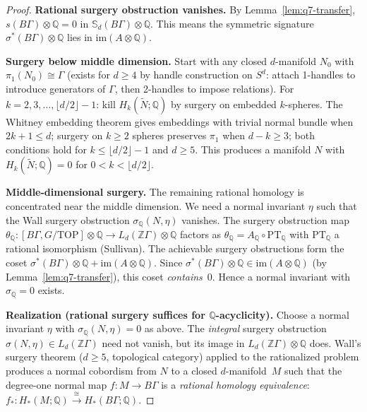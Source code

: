\begin{proof}
\textbf{Rational surgery obstruction vanishes.}
By Lemma~\ref{lem:q7-transfer},
$s(B\Gamma)\otimes\mathbb Q=0$ in $\mathbb S_d(B\Gamma)\otimes\mathbb Q$.
This means the symmetric signature $\sigma^*(B\Gamma)\otimes\mathbb Q$
lies in $\mathrm{im}(A\otimes\mathbb Q)$.

\medskip\noindent
\textbf{Surgery below middle dimension.}
Start with any closed $d$-manifold $N_0$ with $\pi_1(N_0)\cong\Gamma$
(exists for $d\ge 4$ by handle construction on $S^d$: attach 1-handles
to introduce generators of $\Gamma$, then 2-handles to impose relations).
For $k=2,3,\dots,\lfloor d/2\rfloor-1$: kill $H_k(\widetilde N;\mathbb Q)$
by surgery on embedded $k$-spheres.
The Whitney embedding theorem gives embeddings with trivial normal bundle when
$2k+1\le d$; surgery on $k\ge2$ spheres preserves $\pi_1$ when $d-k\ge3$;
both conditions hold for $k\le\lfloor d/2\rfloor-1$ and $d\ge5$.
This produces a manifold $N$ with $H_k(\widetilde N;\mathbb Q)=0$
for $0<k<\lfloor d/2\rfloor$.

\medskip\noindent
\textbf{Middle-dimensional surgery.}
The remaining rational homology is concentrated near the middle dimension.
We need a normal invariant $\eta$ such that the Wall surgery obstruction
$\sigma_{\mathbb Q}(N,\eta)$ vanishes.
The surgery obstruction map
$\theta_{\mathbb Q}\colon[B\Gamma,G/\mathrm{TOP}]\otimes\mathbb Q
 \to L_d(\mathbb Z\Gamma)\otimes\mathbb Q$
factors as $\theta_{\mathbb Q}=A_{\mathbb Q}\circ\mathrm{PT}_{\mathbb Q}$
with $\mathrm{PT}_{\mathbb Q}$ a rational isomorphism (Sullivan).
The achievable surgery obstructions form the coset
$\sigma^*(B\Gamma)\otimes\mathbb Q + \mathrm{im}(A\otimes\mathbb Q)$.
Since $\sigma^*(B\Gamma)\otimes\mathbb Q\in\mathrm{im}(A\otimes\mathbb Q)$
(by Lemma~\ref{lem:q7-transfer}), this coset \emph{contains}~$0$.
Hence a normal invariant with $\sigma_{\mathbb Q}=0$ exists.

\medskip\noindent
\textbf{Realization (rational surgery suffices for $\mathbb Q$-acyclicity).}
Choose a normal invariant $\eta$ with $\sigma_{\mathbb Q}(N,\eta)=0$ as above.
The \emph{integral} surgery obstruction $\sigma(N,\eta)\in L_d(\mathbb Z\Gamma)$
need not vanish, but its image in $L_d(\mathbb Z\Gamma)\otimes\mathbb Q$ does.
Wall's surgery theorem ($d\ge 5$, topological category) applied to the
rationalized problem produces a normal cobordism from $N$ to a closed
$d$-manifold~$M$ such that the degree-one normal map
$f\colon M\to B\Gamma$ is a \emph{rational homology equivalence}:
$f_*\colon H_*(M;\mathbb Q)\xrightarrow{\;\cong\;}H_*(B\Gamma;\mathbb Q)$.


\end{proof}
